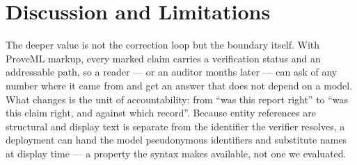 \documentclass[11pt,a4paper]{article}
\begin{document}
\section{Discussion and Limitations}
\label{sec:limitations}

The deeper value is not the correction loop but the boundary itself. With ProveML markup, every marked claim carries a verification status and an addressable path, so a reader --- or an auditor months later --- can ask of any number where it came from and get an answer that does not depend on a model. What changes is the unit of accountability: from ``was this report right'' to ``was this claim right, and against which record''. Because entity references are structural and display text is separate from the identifier the verifier resolves, a deployment can hand the model pseudonymous identifiers and substitute names at display time --- a property the syntax makes available, not one we evaluated.
\end{document}
